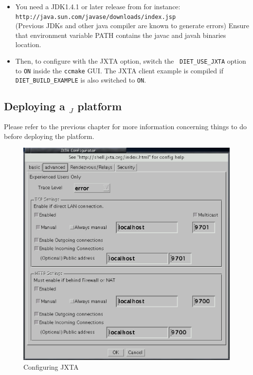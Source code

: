 \begin{itemize}
\item{You need a JDK1.4.1 or later release from for instance:\\
    \noindent
    {\footnotesize
      \texttt{http://java.sun.com/javase/downloads/index.jsp} }\\
      (Previous JDKs and other java compiler are known to generate
      errors) Ensure that environment variable PATH contains the javac
      and javah binaries location.}
  
\item{Then, to configure \diet with the JXTA option, switch the {\tt
    DIET\_USE\_JXTA} option to {\tt ON} inside the {\tt ccmake}
    GUI. The JXTA client example is compiled if {\tt
    DIET\_BUILD\_EXAMPLE} is also switched to {\tt ON}.}

\end{itemize}

\subsection {Deploying a \diet$_{J}$ platform}
\label{ssec:deployjxta}



Please refer to the previous chapter for more information concerning
things to do before deploying the platform.

\begin{figure}[htb]
 \begin{center}
   \includegraphics[scale=0.6]{fig/JXTAConfig}
  \caption{Configuring JXTA \label{fig:platformjxta}}
 \end{center}
\end{figure}


